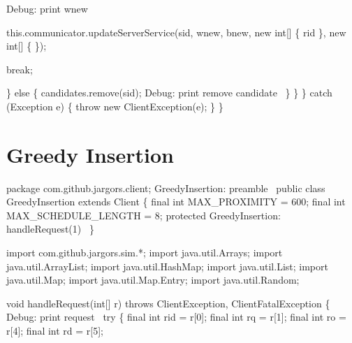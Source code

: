         \LA{}Debug: print wnew~{\nwtagstyle{}}\RA{}

        this.communicator.updateServerService(sid, wnew, bnew,
            new int[] \{ rid \}, new int[] \{ \});

        break;

      \} else \{
        candidates.remove(sid);
        \LA{}Debug: print remove candidate~{\nwtagstyle{}}\RA{}
      \}
    \}
  \} catch (Exception e) \{
    throw new ClientException(e);
  \}
\}
\nwendcode{}\nwdocspar

\section{Greedy Insertion}

\nwenddocs{}\endmoddef\nwstartdeflinemarkup\nwenddeflinemarkup
package com.github.jargors.client;
\LA{}GreedyInsertion: preamble~{\nwtagstyle{}}\RA{}
public class GreedyInsertion extends Client \{
  final int MAX_PROXIMITY = 600;
  final int MAX_SCHEDULE_LENGTH = 8;
  protected \LA{}GreedyInsertion: handleRequest(1)~{\nwtagstyle{}}\RA{}
\}
\nwendcode{}\nwdocspar

\nwenddocs{}\endmoddef\nwstartdeflinemarkup{}\nwenddeflinemarkup
import com.github.jargors.sim.*;
import java.util.Arrays;
import java.util.ArrayList;
import java.util.HashMap;
import java.util.List;
import java.util.Map;
import java.util.Map.Entry;
import java.util.Random;
\nwendcode{}\nwdocspar

\nwenddocs{}\endmoddef\nwstartdeflinemarkup{}\nwenddeflinemarkup
void handleRequest(int[] r) throws ClientException, ClientFatalException \{
  \LA{}Debug: print request~{\nwtagstyle{}}\RA{}
  try \{
    final int rid = r[0];
    final int rq  = r[1];
    final int ro  = r[4];
    final int rd  = r[5];

